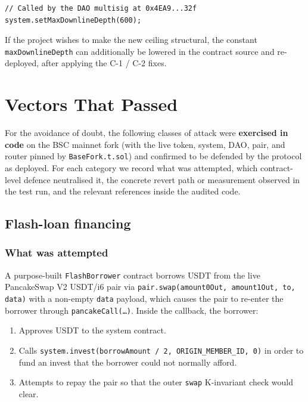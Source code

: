 \documentclass[11pt,a4paper]{article}
\begin{document}
\begin{lstlisting}[caption={Recommended configuration call}]
// Called by the DAO multisig at 0x4EA9...32f
system.setMaxDownlineDepth(600);
\end{lstlisting}

If the project wishes to make the new ceiling structural, the constant
\texttt{maxDownlineDepth} can additionally be lowered in the contract source
and re-deployed, after applying the C-1 / C-2 fixes.

\newpage

\section{Vectors That Passed}
\label{sec:passed}

For the avoidance of doubt, the following classes of attack were
\textbf{exercised in code} on the BSC mainnet fork (with the live token,
system, DAO, pair, and router pinned by \texttt{BaseFork.t.sol}) and confirmed
to be defended by the protocol as deployed. For each category we record what
was attempted, which contract-level defence neutralised it, the concrete
revert path or measurement observed in the test run, and the relevant
references inside the audited code.

\subsection{Flash-loan financing}

\subsubsection*{What was attempted}

A purpose-built \texttt{FlashBorrower} contract borrows USDT from the live
PancakeSwap V2 USDT/i6 pair via \texttt{pair.swap(amount0Out, amount1Out, to,
data)} with a non-empty \texttt{data} payload, which causes the pair to
re-enter the borrower through \texttt{pancakeCall(\dots)}. Inside the
callback, the borrower:

\begin{enumerate}[leftmargin=*]
    \item Approves USDT to the system contract.
    \item Calls
          \texttt{system.invest(borrowAmount / 2, ORIGIN\_MEMBER\_ID, 0)} in
          order to fund an invest that the borrower could not normally
          afford.
    \item Attempts to repay the pair so that the outer \texttt{swap}
          K-invariant check would clear.
\end{enumerate}
\end{document}
